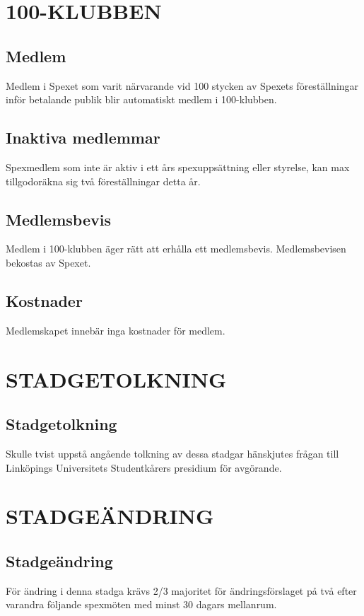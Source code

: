 \documentclass[a4paper]{article}
\begin{document}
\section{100-KLUBBEN}
\label{section:100-klubben}

\subsection{Medlem}
Medlem i Spexet som varit närvarande vid 100 stycken av Spexets föreställningar inför betalande publik blir automatiskt medlem i 100-klubben.

\subsection{Inaktiva medlemmar}
Spexmedlem som inte är aktiv i ett års spexuppsättning eller styrelse, kan max tillgodoräkna sig två föreställningar detta år.

\subsection{Medlemsbevis}
Medlem i 100-klubben äger rätt att erhålla ett medlemsbevis. Medlemsbevisen bekostas av Spexet.

\subsection{Kostnader}
Medlemskapet innebär inga kostnader för medlem.

\section{STADGETOLKNING}
\subsection{Stadgetolkning}
Skulle tvist uppstå angående tolkning av dessa stadgar hänskjutes frågan till Linköpings Universitets Studentkårers presidium för avgörande.

\section{STADGEÄNDRING}
\subsection{Stadgeändring}
För ändring i denna stadga krävs 2/3 majoritet för ändringsförslaget på två efter varandra följande spexmöten med minst 30 dagars mellanrum.
\end{document}
